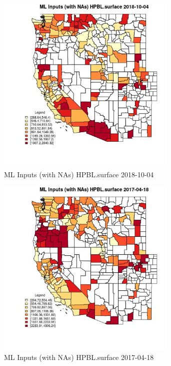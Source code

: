 \begin{figure} 
\centering  
\includegraphics[width=0.77\textwidth]{Code_Outputs/Report_ML_input_PM25_Step4_part_f_de_duplicated_aveswNAs_CountyHPBLsurfaceMean2018-10-04.jpg} 
\caption{\label{fig:Report_ML_input_PM25_Step4_part_f_de_duplicated_aveswNAsCountyHPBLsurfaceMean2018-10-04}ML Inputs (with NAs) HPBL.surface 2018-10-04} 
\end{figure} 
 

\begin{figure} 
\centering  
\includegraphics[width=0.77\textwidth]{Code_Outputs/Report_ML_input_PM25_Step4_part_f_de_duplicated_aveswNAs_CountyHPBLsurfaceMean2017-04-18.jpg} 
\caption{\label{fig:Report_ML_input_PM25_Step4_part_f_de_duplicated_aveswNAsCountyHPBLsurfaceMean2017-04-18}ML Inputs (with NAs) HPBL.surface 2017-04-18} 
\end{figure} 
 

